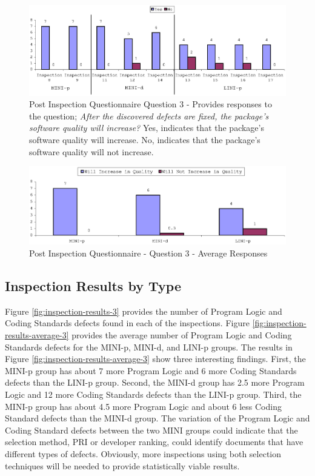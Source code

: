 \begin{figure}[!h]
  \centering
  \includegraphics[width=1.0\textwidth]{figs/Results/post-inspection-3.eps}
  \caption[Post Inspection Questionnaire - Question 3]{Post Inspection
    Questionnaire Question 3 - Provides responses to the question;
    \textit{After the discovered defects are fixed, the package's software
      quality will increase?} Yes, indicates that the package's software
    quality will increase. No, indicates that the package's software
    quality will not increase.}
  \label{fig:post-inspection-3}
\end{figure}

\begin{figure}[!h]
  \centering
  \includegraphics[width=1.0\textwidth]{figs/Results/post-inspection-3-average.eps}
  \caption{Post Inspection Questionnaire - Question 3 - Average Responses}
  \label{fig:post-inspection-3-average}
\end{figure}

\newpage
\subsection{Inspection Results by Type}
Figure \ref{fig:inspection-results-3} provides the number of Program Logic
and Coding Standards defects found in each of the inspections. Figure
\ref{fig:inspection-results-average-3} provides the average number of
Program Logic and Coding Standards defects for the MINI-p, MINI-d, and
LINI-p groups. The results in Figure \ref{fig:inspection-results-average-3}
show three interesting findings. First, the MINI-p group has about 7 more
Program Logic and 6 more Coding Standards defects than the LINI-p group.
Second, the MINI-d group has 2.5 more Program Logic and 12 more Coding
Standards defects than the LINI-p group. Third, the MINI-p group has about
4.5 more Program Logic and about 6 less Coding Standard defects than the
MINI-d group. The variation of the Program Logic and Coding Standard
defects between the two MINI groups could indicate that the selection
method, PRI or developer ranking, could identify documents that have
different types of defects. Obviously, more inspections using both
selection techniques will be needed to provide statistically viable
results.


